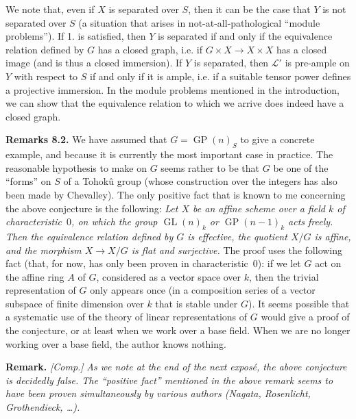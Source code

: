 \documentclass{article}
\newenvironment{rmenv}[1]
  {\phantomsection\par\medskip\noindent\textbf{#1.}\rmfamily}
  {\medskip}
\newcommand{\scr}[1]{{\mathscr{#1}}}
\DeclareMathOperator{\GL}{GL}
\DeclareMathOperator{\GP}{GP}
\newcommand{\oldpage}[1]{\marginpar{\footnotesize$\Big\vert$ \textit{p.~#1}}}
\begin{document}
We note that, even if $X$ is separated over $S$, then it can be the case that $Y$ is not separated over $S$ (a situation that arises in not-at-all-pathological ``module problems'').
If 1. is satisfied, then $Y$ is separated if and only if the equivalence relation defined by $G$ has a closed graph, i.e. if $G\times X\to X\times X$ has a closed image (and is thus a closed immersion).
If $Y$ is separated, then $\scr{L}'$ is pre-ample on $Y$ with respect to $S$ if and only if it is ample, i.e. if a suitable tensor power defines a projective immersion.
In the module problems mentioned in the introduction, we can show that the equivalence relation to which we arrive does indeed have a closed graph.

\begin{rmenv}{Remarks 8.2}
  We have assumed that $G=\GP(n)_S$ to give a concrete example, and because it is currently the most important case in practice.
  The reasonable hypothesis to make on $G$ seems rather to be that $G$ be one of the ``forms'' on $S$ of a Tohok\^{u} group (whose construction over the integers has also been made by Chevalley).
  The only positive fact that is known to me concerning the above conjecture is the following:
  \emph{Let $X$ be an affine scheme over a field $k$ of characteristic~$0$, on which the group $\GL(n)_k$ or $\GP(n-1)_k$ acts freely. Then the equivalence relation defined by $G$ is effective, the quotient $X/G$ is affine, and the morphism $X\to X/G$ is flat and surjective.}
  The proof uses the following fact (that, for now, has only been proven in characteristic~$0$):
  if we let $G$ act on the affine ring $A$ of $G$, considered as a vector space over $k$, then the trivial representation of $G$ only appears once (in a composition series of a vector subspace of finite dimension over $k$ that is stable under $G$).
  It seems possible that a systematic use of the
\oldpage{212-20}
  theory of linear representations of $G$ would give a proof of the conjecture, or at least when we work over a base field.
  When we are no longer working over a base field, the author knows nothing.
\end{rmenv}

\begin{rmenv}{Remark}
  \emph{[Comp.]}
  \emph{As we note at the end of the next expos\'{e}, the above conjecture is decidedly false. The ``positive fact'' mentioned in the above remark seems to have been proven simultaneously by various authors (Nagata, Rosenlicht, Grothendieck, \ldots).}
\end{rmenv}
\end{document}

